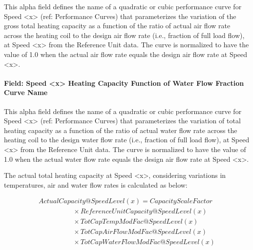This alpha field defines the name of a quadratic or cubic performance curve for Speed \textless{}x\textgreater{} (ref: Performance Curves) that parameterizes the variation of the gross total heating capacity as a function of the ratio of actual air flow rate across the heating coil to the design air flow rate (i.e., fraction of full load flow), at Speed \textless{}x\textgreater{} from the Reference Unit data. The curve is normalized to have the value of 1.0 when the actual air flow rate equals the design air flow rate at Speed \textless{}x\textgreater{}.

\paragraph{Field: Speed \textless{}x\textgreater{} Heating Capacity Function of Water Flow Fraction Curve Name}\label{field-speed-x-heating-capacity-function-of-water-flow-fraction-curve-name}

This alpha field defines the name of a quadratic or cubic performance curve for Speed \textless{}x\textgreater{} (ref: Performance Curves) that parameterizes the variation of total heating capacity as a function of the ratio of actual water flow rate across the heating coil to the design water flow rate (i.e., fraction of full load flow), at Speed \textless{}x\textgreater{} from the Reference Unit data. The curve is normalized to have the value of 1.0 when the actual water flow rate equals the design air flow rate at Speed \textless{}x\textgreater{}.

The actual total heating capacity at Speed \textless{}x\textgreater{}, considering variations in temperatures, air and water flow rates is calculated as below:

\begin{equation}
  \begin{array}{l}
    ActualCapacity@SpeedLevel\left( x \right) = CapacityScaleFactor \\
    \quad \quad \quad \quad \quad \times ReferenceUnitCapacity@SpeedLevel(x) \\
    \quad \quad \quad \quad \quad \times TotCapTempModFac@SpeedLevel(x) \\
    \quad \quad \quad \quad \quad \times TotCapAirFlowModFac@SpeedLevel(x) \\
    \quad \quad \quad \quad \quad \times TotCapWaterFlowModFac@SpeedLevel(x)
  \end{array}
\end{equation}


